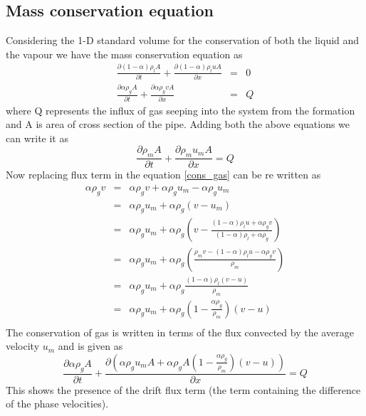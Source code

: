 \documentclass[a4paper,16pt]{article}
\begin{document}
\subsection{Mass conservation equation}
Considering the 1-D standard volume for the conservation of both the liquid and the vapour we have the mass conservation equation as
\begin{eqnarray}
\frac{\partial{(1-\alpha)\rho_{l}}A}{\partial t} + \frac{\partial{(1-\alpha)\rho_{l}}u A}{\partial{x}} &=& 0\\
\label{cons_liquid}
\frac{\partial{\alpha \rho_g} A}{\partial t} + \frac{\partial{\alpha \rho_{g}}v A}{\partial{x}} &=& Q
\label{cons_gas}
\end{eqnarray}
where Q represents the influx of gas seeping into the system from the formation and A is area of cross section of the pipe. Adding both the above equations we can write it as
\begin{equation}
\frac{\partial{\rho_{m}} A}{\partial t} + \frac{\partial{\rho_{m}}u_{m}A}{\partial{x}} = Q
\label{cons_mixture}
\end{equation}
Now replacing flux term in the equation \ref{cons_gas} can be re written as
\begin{eqnarray}
\alpha \rho_{g}v &=& \alpha \rho_{g}v + \alpha \rho_{g} u_m - \alpha \rho_{g} u_m \\
 &=& \alpha \rho_{g} u_m + \alpha \rho_{g}(v - u_m)\\
 &=& \alpha \rho_{g} u_m + \alpha \rho_{g}(v - \frac{(1-\alpha)\rho_{l}u + \alpha \rho_{g}v}{(1-\alpha)\rho_{l} + \alpha \rho_{g}})\\
 &=& \alpha \rho_{g} u_m + \alpha \rho_{g}( \frac{\rho_m v -(1-\alpha)\rho_{l}u - \alpha \rho_{g}v}{\rho_m})\\
 &=& \alpha \rho_{g} u_m + \alpha \rho_{g} \frac{(1-\alpha)\rho_{l}(v-u)}{\rho_m}\\
 &=& \alpha \rho_{g} u_m + \alpha \rho_{g} (1-\frac{\alpha \rho_{g}}{\rho_m})(v-u)\\
\end{eqnarray}
The conservation of gas is written in terms of the flux convected by the average velocity $u_m$ and is given as
\begin{equation}
\frac{\partial{\alpha \rho_g} A}{\partial t} + \frac{\partial{(\alpha \rho_{g} u_m A + \alpha \rho_{g} A (1-\frac{\alpha \rho_{g}}{\rho_m})(v-u))}}{\partial{x}} = Q
\label{cons_gas_um}
\end{equation}
This shows the presence of the drift flux term (the term containing the difference of the phase velocities).
\end{document}
